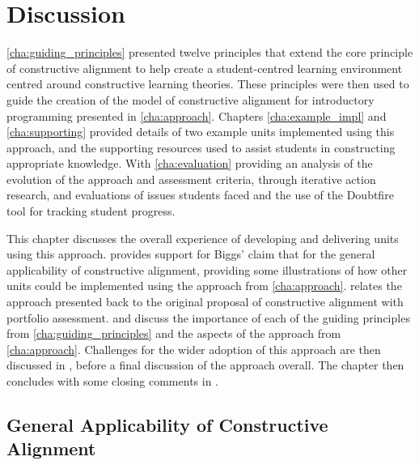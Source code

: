 
\chapter{Discussion} %
\label{cha:discussion}

\graphicspath{{Figures/Discussion/}}

\cref{cha:guiding_principles} presented twelve principles that extend the core principle of constructive alignment to help create a student-centred learning environment centred around constructive learning theories. These principles were then used to guide the creation of the model of constructive alignment for introductory programming presented in \cref{cha:approach}. Chapters \ref{cha:example_impl} and \ref{cha:supporting} provided details of two example units implemented using this approach, and the supporting resources used to assist students in constructing appropriate knowledge. With \cref{cha:evaluation} providing an analysis of the evolution of the approach and assessment criteria, through iterative action research, and evaluations of issues students faced and the use of the Doubtfire tool for tracking student progress. 

This chapter discusses the overall experience of developing and delivering units using this approach.  provides support for Biggs' claim that for the general applicability of constructive alignment, providing some illustrations of how other units could be implemented using the approach from \cref{cha:approach}.  relates the approach presented back to the original proposal of constructive alignment with portfolio assessment.  and  discuss the importance of each of the guiding principles from \cref{cha:guiding_principles} and the aspects of the approach from \cref{cha:approach}. Challenges for the wider adoption of this approach are then discussed in , before a final discussion of the approach overall. The chapter then concludes with some closing comments in .

\clearpage

\section{General Applicability of Constructive Alignment} %
\label{sec:general_applicability_of_constructive_alignment}

